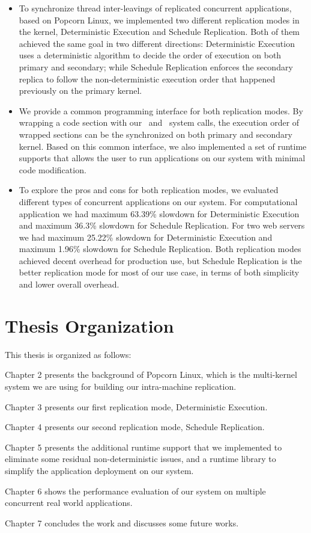 \begin{itemize}
\item To synchronize thread inter-leavings of replicated concurrent applications, based on Popcorn Linux, we implemented two different replication modes in the kernel, Deterministic Execution and Schedule Replication. Both of them achieved the same goal in two different directions: Deterministic Execution uses a deterministic algorithm to decide the order of execution on both primary and secondary; while Schedule Replication enforces the secondary replica to follow the non-deterministic execution order that happened previously on the primary kernel.

\item We provide a common programming interface for both replication modes. By wrapping a code section with our \detstart\ and \detend\ system calls, the execution order of wrapped sections can be the synchronized on both primary and secondary kernel. Based on this common interface, we also implemented a set of runtime supports that allows the user to run applications on our system with minimal code modification.

\item To explore the pros and cons for both replication modes, we evaluated different types of concurrent applications on our system. For computational application we had maximum 63.39\% slowdown for Deterministic Execution and maximum 36.3\% slowdown for Schedule Replication. For two web servers we had maximum 25.22\% slowdown for Deterministic Execution and maximum 1.96\% slowdown for Schedule Replication. Both replication modes achieved decent overhead for production use, but Schedule Replication is the better replication mode for most of our use case, in terms of both simplicity and lower overall overhead.
\end{itemize}

\section{Thesis Organization}
This thesis is organized as follows:

Chapter 2 presents the background of Popcorn Linux, which is the multi-kernel system we are using for building our intra-machine replication.

Chapter 3 presents our first replication mode, Deterministic Execution. 

Chapter 4 presents our second replication mode, Schedule Replication.

Chapter 5 presents the additional runtime support that we implemented to eliminate some residual non-deterministic issues, and a runtime library to simplify the application deployment on our system.

Chapter 6 shows the performance evaluation of our system on multiple concurrent real world applications.

Chapter 7 concludes the work and discusses some future works.